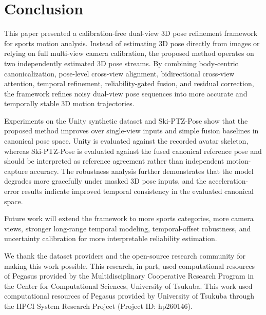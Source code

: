 \documentclass[sigconf,screen]{acmart}
\begin{document}
\section{Conclusion}
\label{sec:conclusion}

This paper presented a calibration-free dual-view 3D pose refinement framework for sports motion analysis. Instead of estimating 3D pose directly from images or relying on full multi-view camera calibration, the proposed method operates on two independently estimated 3D pose streams. By combining body-centric canonicalization, pose-level cross-view alignment, bidirectional cross-view attention, temporal refinement, reliability-gated fusion, and residual correction, the framework refines noisy dual-view pose sequences into more accurate and temporally stable 3D motion trajectories.

Experiments on the Unity synthetic dataset and Ski-PTZ-Pose show that the proposed method improves over single-view inputs and simple fusion baselines in canonical pose space. Unity is evaluated against the recorded avatar skeleton, whereas Ski-PTZ-Pose is evaluated against the fused canonical reference pose and should be interpreted as reference agreement rather than independent motion-capture accuracy. The robustness analysis further demonstrates that the model degrades more gracefully under masked 3D pose inputs, and the acceleration-error results indicate improved temporal consistency in the evaluated canonical space.

Future work will extend the framework to more sports categories, more camera views, stronger long-range temporal modeling, temporal-offset robustness, and uncertainty calibration for more interpretable reliability estimation.

\begin{acks}

We thank the dataset providers and the open-source research community for making this work possible.
This research, in part, used computational resources of Pegasus provided by the Multidisciplinary Cooperative Research Program in the Center for Computational Sciences, University of Tsukuba.
This work used computational resources of Pegasus provided by University of Tsukuba through the HPCI System Research Project (Project ID: hp260146).
\end{acks}




\end{document}
